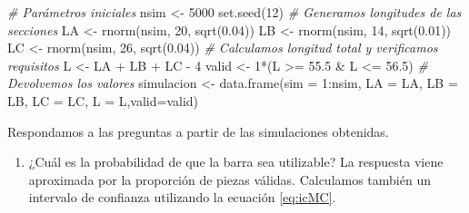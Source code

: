 \documentclass[
]{book}
\newenvironment{Shaded}{\begin{snugshade}}{\end{snugshade}}
\newcommand{\AttributeTok}[1]{\textcolor[rgb]{0.77,0.63,0.00}{#1}}
\newcommand{\CommentTok}[1]{\textcolor[rgb]{0.56,0.35,0.01}{\textit{#1}}}
\newcommand{\DecValTok}[1]{\textcolor[rgb]{0.00,0.00,0.81}{#1}}
\newcommand{\FloatTok}[1]{\textcolor[rgb]{0.00,0.00,0.81}{#1}}
\newcommand{\FunctionTok}[1]{\textcolor[rgb]{0.00,0.00,0.00}{#1}}
\newcommand{\NormalTok}[1]{#1}
\newcommand{\OtherTok}[1]{\textcolor[rgb]{0.56,0.35,0.01}{#1}}
\newcommand{\SpecialCharTok}[1]{\textcolor[rgb]{0.00,0.00,0.00}{#1}}
\providecommand{\tightlist}{%
  \setlength{\itemsep}{0pt}\setlength{\parskip}{0pt}}
\theoremstyle{definition}
\theoremstyle{definition}
\theoremstyle{definition}
\theoremstyle{definition}
\theoremstyle{remark}
\begin{document}
\begin{Shaded}
\begin{Highlighting}[]
\CommentTok{\# Parámetros iniciales}
\NormalTok{nsim }\OtherTok{\textless{}{-}} \DecValTok{5000}
\FunctionTok{set.seed}\NormalTok{(}\DecValTok{12}\NormalTok{)}
\CommentTok{\# Generamos longitudes de las secciones}
\NormalTok{LA }\OtherTok{\textless{}{-}} \FunctionTok{rnorm}\NormalTok{(nsim, }\DecValTok{20}\NormalTok{, }\FunctionTok{sqrt}\NormalTok{(}\FloatTok{0.04}\NormalTok{))}
\NormalTok{LB }\OtherTok{\textless{}{-}} \FunctionTok{rnorm}\NormalTok{(nsim, }\DecValTok{14}\NormalTok{, }\FunctionTok{sqrt}\NormalTok{(}\FloatTok{0.01}\NormalTok{))}
\NormalTok{LC }\OtherTok{\textless{}{-}} \FunctionTok{rnorm}\NormalTok{(nsim, }\DecValTok{26}\NormalTok{, }\FunctionTok{sqrt}\NormalTok{(}\FloatTok{0.04}\NormalTok{))}
\CommentTok{\# Calculamos longitud total y verificamos requisitos}
\NormalTok{L }\OtherTok{\textless{}{-}}\NormalTok{ LA }\SpecialCharTok{+}\NormalTok{ LB }\SpecialCharTok{+}\NormalTok{ LC }\SpecialCharTok{{-}} \DecValTok{4}
\NormalTok{valid }\OtherTok{\textless{}{-}} \DecValTok{1}\SpecialCharTok{*}\NormalTok{(L }\SpecialCharTok{\textgreater{}=} \FloatTok{55.5} \SpecialCharTok{\&}\NormalTok{ L }\SpecialCharTok{\textless{}=} \FloatTok{56.5}\NormalTok{)}
\CommentTok{\# Devolvemos los valores }
\NormalTok{simulacion }\OtherTok{\textless{}{-}} \FunctionTok{data.frame}\NormalTok{(}\AttributeTok{sim =} \DecValTok{1}\SpecialCharTok{:}\NormalTok{nsim, }\AttributeTok{LA =}\NormalTok{ LA, }\AttributeTok{LB =}\NormalTok{ LB, }
                         \AttributeTok{LC =}\NormalTok{ LC, }\AttributeTok{L =}\NormalTok{ L,}\AttributeTok{valid=}\NormalTok{valid)}
\end{Highlighting}
\end{Shaded}

Respondamos a las preguntas a partir de las simulaciones obtenidas.

\begin{enumerate}
\def\labelenumi{\arabic{enumi}.}
\tightlist
\item
  ¿Cuál es la probabilidad de que la barra sea utilizable? La respuesta viene aproximada por la proporción de piezas válidas. Calculamos también un intervalo de confianza utilizando la ecuación \eqref{eq:icMC}.
\end{enumerate}
\end{document}
